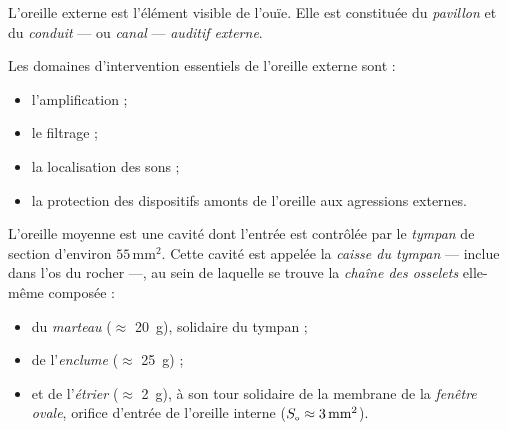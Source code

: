 L'oreille externe est l'élément visible de l'ouïe. Elle est constituée du \emph{pavillon} et du \emph{conduit} --- ou \emph{canal} --- \emph{auditif externe}.

Les domaines d'intervention essentiels de l'oreille externe sont :
\begin{multicols}{2}
\setlength{\columnsep}{8pt}
\begin{itemize}
\item l'amplification ;
\item le filtrage ;
\item la localisation des sons ;
\item la protection des dispositifs amonts de l'oreille aux agressions externes.
\end{itemize}
\end{multicols}

L'oreille moyenne est une cavité dont l'entrée est contrôlée par le \emph{tympan} de section d'environ $55\,\mbox{mm}^{2}$. Cette cavité est appelée la \emph{caisse du tympan} --- inclue 
dans l'os du rocher ---, au sein de laquelle se trouve la \emph{chaîne des osselets} elle-même composée :
\begin{itemize}
\item du \emph{marteau} ($\approx$ 20~g), solidaire du tympan ;
\item de l'\emph{enclume} ($\approx$ 25~g) ;
\item et de l'\emph{étrier} ($\approx$ 2~g), à son tour solidaire de la membrane de la \emph{fenêtre ovale},
orifice d'entrée de l'oreille interne ($S_{\mbox{\tiny o}} \approx 3\,\mbox{mm}^{2}$).
\end{itemize}

